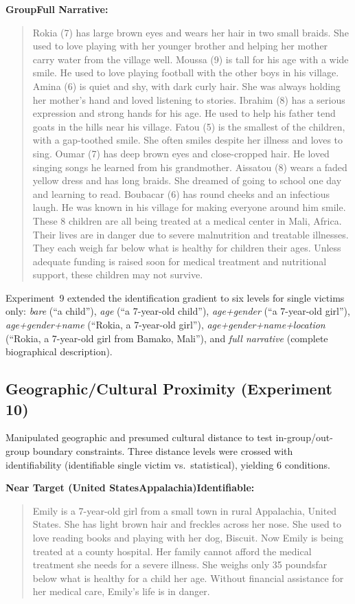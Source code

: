 \textbf{Group\textemdash Full Narrative:}
\begin{quote}
Rokia (7) has large brown eyes and wears her hair in two small braids. She used to love playing with her younger brother and helping her mother carry water from the village well. Moussa (9) is tall for his age with a wide smile. He used to love playing football with the other boys in his village. Amina (6) is quiet and shy, with dark curly hair. She was always holding her mother's hand and loved listening to stories. Ibrahim (8) has a serious expression and strong hands for his age. He used to help his father tend goats in the hills near his village. Fatou (5) is the smallest of the children, with a gap-toothed smile. She often smiles despite her illness and loves to sing. Oumar (7) has deep brown eyes and close-cropped hair. He loved singing songs he learned from his grandmother. Aissatou (8) wears a faded yellow dress and has long braids. She dreamed of going to school one day and learning to read. Boubacar (6) has round cheeks and an infectious laugh. He was known in his village for making everyone around him smile. These 8 children are all being treated at a medical center in Mali, Africa. Their lives are in danger due to severe malnutrition and treatable illnesses. They each weigh far below what is healthy for children their ages. Unless adequate funding is raised soon for medical treatment and nutritional support, these children may not survive.
\end{quote}

\noindent Experiment~9 extended the identification gradient to six levels for single victims only: \textit{bare} (``a child''), \textit{age} (``a 7-year-old child''), \textit{age+gender} (``a 7-year-old girl''), \textit{age+gender+name} (``Rokia, a 7-year-old girl''), \textit{age+gender+name+location} (``Rokia, a 7-year-old girl from Bamako, Mali''), and \textit{full narrative} (complete biographical description).

\subsection{Geographic/Cultural Proximity (Experiment 10)}
Manipulated geographic and presumed cultural distance to test in-group/out-group boundary constraints. Three distance levels were crossed with identifiability (identifiable single victim vs.\ statistical), yielding 6 conditions.

\textbf{Near Target (United States\textemdash Appalachia)\textemdash Identifiable:}
\begin{quote}
Emily is a 7-year-old girl from a small town in rural Appalachia, United States. She has light brown hair and freckles across her nose. She used to love reading books and playing with her dog, Biscuit. Now Emily is being treated at a county hospital. Her family cannot afford the medical treatment she needs for a severe illness. She weighs only 35 pounds\textemdash far below what is healthy for a child her age. Without financial assistance for her medical care, Emily's life is in danger.
\end{quote}

